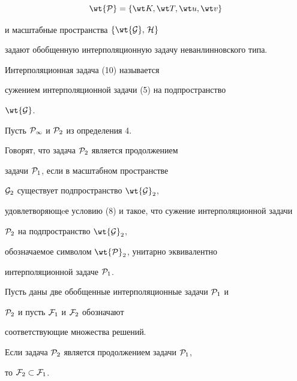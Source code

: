 \begin{equation}


\wt {\cal P} =\{ \wt K,\wt T,\wt u, \wt v \}


\end{equation}


и масштабные пространства $\{\wt {\cal G},\,{\cal H}\}$


задают обобщенную интерполяционную задачу неванлинновского типа.





\begin{defn}


Интерполяционная задача (10) называется


сужением интерполяционной задачи (5) на подпространство


$\wt {\cal G}$.


\end{defn}





\begin{defn}


Пусть $\cal P_1$ и ${\cal P}_2$ из определения 4.


Говорят, что задача ${\cal P}_2 $ является продолжением


задачи ${\cal P}_1$, если в масштабном пространстве


${\cal G}_2$ существует подпространство $\wt {\cal G}_2$,


удовлетворяющeе условию (8) и такое, что сужение интерполяционной задачи


${\cal P}_2 $ на подпространство $ \wt {\cal G}_2 $,


обозначаемое символом $\wt {\cal P}_2$, унитарно эквивалентно


интерполяционной задаче ${\cal P}_1$.


\end{defn}





\begin{thm}


Пусть даны две обобщенные интерполяционные задачи $ {\cal P}_1$ и


$ {\cal P}_2$ и пусть ${\cal F}_1$ и ${\cal F}_2$ обозначают


соответствующие множества решений.





Если задача $ {\cal P}_2 $ является продолжением задачи ${\cal P}_1$,


то ${\cal F}_2 \subset {\cal F}_1$.


\end{thm}





